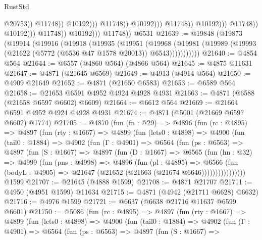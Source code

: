 \begin{lexlean}{RustStd}
\begin{coremodule}
                                                              @20753))
                                                          @11748))
                                                      @10192)))
                                                @11748))
                                            @10192)))
                                      @11748))
                                  @10192)))
                            @11748))
                        @10192)))
                  @11748))
              @10192)))
        @11748))
    @6531
@21639 := @19848
    (@19873
      (@19914
        (@19916
          (@19918
            (@19935
              (@19951
                (@19968
                  (@19981 (@19989 (@19993 (@21622 (@5772 (@6536 @47 @1578 @20013)) @6543)))))))))))
@21640 := @4854 @564
@21644 := @6557 (@4860 @564) (@4866 @564)
@21645 := @4875 @11631
@21647 := @4871 (@21645 @6569)
@21649 := @4913 (@4914 @564)
@21650 := @4909 @21649
@21652 := @4871 (@21650 @6583)
@21653 := @6589 @564
@21658 := @21653 @6591 @4952 @4924 @4928 @4931
@21663 := @4871 (@6588 (@21658 @6597 @6602) @6609)
@21664 := @6612 @564
@21669 := @21664 @6591 @4952 @4924 @4928 @4931
@21674 := @4871 (@5001 (@21669 @6597 @6602) @1774)
@21705 := @4870
    (fun (fn : @29) =>
    @4896
      (fun (rc : @4895) =>
      @4897
        (fun (rty : @1667) =>
        @4899
          (fun (lets0 : @4898) =>
          @4900
            (fun (tail0 : @1884) =>
            @4902
              (fun (Γ : @4901) =>
              @6564
                (fun (ps : @6563) =>
                @4897
                  (fun (S : @1667) =>
                  @4897
                    (fun (D : @1667) =>
                    @6565
                      (fun (hn : @32) =>
                      @4999
                        (fun (pns : @4998) =>
                        @4896
                          (fun (pl : @4895) =>
                          @6566
                            (fun (bodyL : @4905) =>
                            @21647 (@21652 (@21663 (@21674 @6646))))))))))))))))
    @1599
@21707 := @21645 (@4888 @1599)
@21708 := @4871 @21707
@21711 := @4950 (@4951 @1599) @11634
@21715 := @4871 (@4942 (@21711 @6628) @6632)
@21716 := @4976 @1599
@21721 := @6637 (@6638 @21716 @11637 @6599 @6601)
@21750 := @5086
    (fun (rc : @4895) =>
    @4897
      (fun (rty : @1667) =>
      @4899
        (fun (lets0 : @4898) =>
        @4900
          (fun (tail0 : @1884) =>
          @4902
            (fun (Γ : @4901) =>
            @6564
              (fun (ps : @6563) =>
              @4897
                (fun (S : @1667) =>

\end{coremodule}
\end{lexlean}
